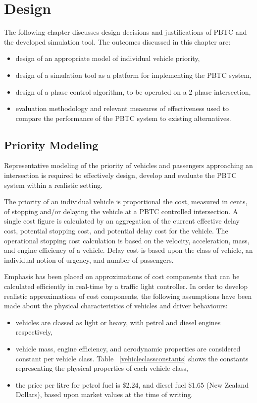 \chapter{Design}

The following chapter discusses design decisions and justifications of PBTC and the developed simulation tool. The outcomes discussed in this chapter are:

\begin{itemize}
\item design of an appropriate model of individual vehicle priority,
\item design of a simulation tool as a platform for implementing the PBTC system,
\item design of a phase control algorithm, to be operated on a 2 phase intersection,
\item evaluation methodology and relevant measures of effectiveness used to compare the performance of the PBTC system to existing alternatives.
\end{itemize}

\section{Priority Modeling}

Representative modeling of the priority of vehicles and passengers approaching an intersection is required to effectively design, develop and evaluate the PBTC system within a realistic setting. 

The priority of an individual vehicle is proportional the cost, measured in cents, of stopping and/or delaying the vehicle at a PBTC controlled intersection. A single cost figure is calculated by an aggregation of the current effective delay cost, potential stopping cost, and potential delay cost for the vehicle. The operational stopping cost calculation is based on the velocity, acceleration, mass, and engine efficiency of a vehicle. Delay cost is based upon the class of vehicle, an individual notion of urgency, and number of passengers.

Emphasis has been placed on approximations of cost components that can be calculated efficiently in real-time by a traffic light controller. In order to develop realistic approximations of cost components, the following assumptions have been made about the physical characteristics of vehicles and driver behaviours:

\begin{itemize}
\item vehicles are classed as light or heavy, with petrol and diesel engines respectively,
\item vehicle mass, engine efficiency, and aerodynamic properties are considered constant per vehicle class. Table ~\ref{vehicleclassconstants} shows the constants representing the physical properties of each vehicle class,
\item the price per litre for petrol fuel is \$2.24, and diesel fuel \$1.65 (New Zealand Dollars), based upon market values at the time of writing.
\end{itemize}

